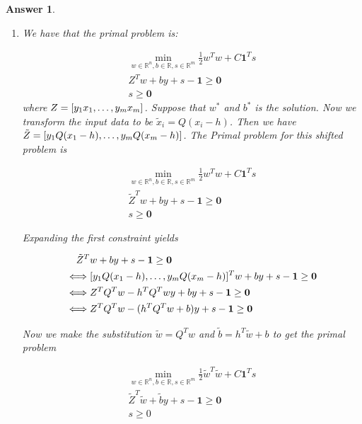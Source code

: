 \documentclass[12pt]{article}
\theoremstyle{colon}
\newtheorem*{answer}{Answer}
\begin{document}
\begin{answer}
  \

  \begin{enumerate}[label=\alph*)]
    \item We have that the primal problem is:

      \begin{gather*}
       \min_{w \in \mathbb{R}^n, b \in \mathbb{R}, s \in \mathbb{R}^m} \frac{1}{2} w^T w + C \bm{1}^T s \\
       Z^T w + b y + s - \bm{1} \geq \bm{0} \\
       s \geq \bm{0}
      \end{gather*}
      where $Z = [y_1 x_1, \mathellipsis, y_m x_m]$. Suppose that $w^*$ and $b^*$ is the solution. Now we transform the input data to be $\tilde{x}_i = Q(x_i - h)$. Then we have $\tilde{Z} = [y_1 Q(x_1 - h), \mathellipsis, y_m Q(x_m -h )]$. The Primal problem for this shifted problem is

      \begin{gather*}
       \min_{w \in \mathbb{R}^n, b \in \mathbb{R}, s \in \mathbb{R}^m} \frac{1}{2} w^T w + C \bm{1}^T s \\
       \tilde{Z}^T w + b y + s - \bm{1} \geq \bm{0} \\
       s \geq \bm{0}
      \end{gather*}

      Expanding the first constraint yields

      \begin{align*}
       &\quad \tilde{Z}^T w + b y + s - \bm{1} \geq \bm{0} \\
       &\Longleftrightarrow [y_1 Q(x_1 - h), \mathellipsis, y_m Q(x_m - h)]^T w + b y + s - \bm{1} \geq \bm{0} \\
       &\Longleftrightarrow Z^T Q^T w - h^T Q^T w y + by + s - \bm{1} \geq \bm{0} \\
       &\Longleftrightarrow Z^T Q^T w - (h^T Q^T w + b) y + s - \bm{1} \geq \bm{0}
      \end{align*}

      Now we make the substitution $\tilde{w} = Q^T w$ and $\tilde{b} = h^T \tilde{w} + b$ to get the primal problem

      \begin{gather*}
       \min_{w \in \mathbb{R}^n, b \in \mathbb{R}, s \in \mathbb{R}^m} \frac{1}{2} \tilde{w}^T \tilde{w} + C \bm{1}^T s \\
       \tilde{Z}^T \tilde{w} + \tilde{b} y + s - \bm{1} \geq \bm{0} \\
       s \geq 0
      \end{gather*}


\end{enumerate}
\end{answer}
\end{document}
